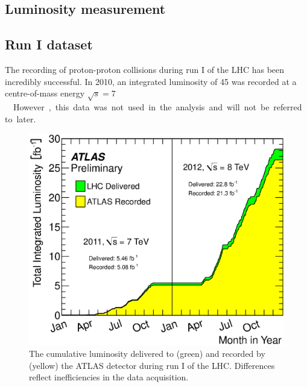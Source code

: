 
\subsection{Luminosity measurement}



\subsection{Run I dataset}

The recording of proton-proton collisions during run I of the LHC has been incredibly 
successful. In 2010, an integrated luminosity of \unit{45}{\invpb} was recorded at a 
centre-of-mass energy \unit{$\sqrt{s} = 7$}{\TeV}. However, this data was not used in the 
analysis and will not be referred to later.

\begin{figure}
	\includegraphics[width=\largefigwidth]{tex/experiment/luminosity}
	\caption{The cumulative luminosity delivered to (green) and recorded by (yellow) the
	ATLAS detector during run I of the \ac{LHC}. Differences reflect inefficiencies in the
	data acquisition. 
	}
	\label{fig:luminosity}
\end{figure}

